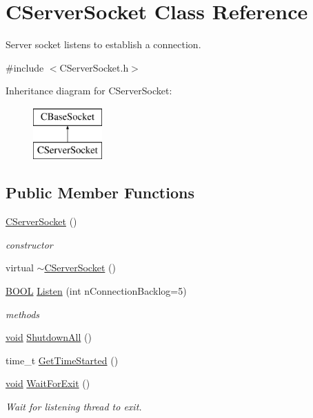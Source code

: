 \hypertarget{class_c_server_socket}{\section{\-C\-Server\-Socket \-Class \-Reference}
\label{class_c_server_socket}
}


\-Server socket listens to establish a connection.  




{\ttfamily \#include $<$\-C\-Server\-Socket.\-h$>$}

\-Inheritance diagram for \-C\-Server\-Socket\-:\begin{figure}[H]
\begin{center}
\leavevmode
\includegraphics[height=2.000000cm]{class_c_server_socket}
\end{center}
\end{figure}
\subsection*{\-Public \-Member \-Functions}
\begin{DoxyCompactItemize}
\item 
\hyperlink{class_c_server_socket_a3ad9f83aa8aace5b319901abcc3b294b}{\-C\-Server\-Socket} ()
\begin{DoxyCompactList}\small\item\em constructor \end{DoxyCompactList}\item 
virtual \hyperlink{class_c_server_socket_a2efd5612c3e0258a6c3bb4fccca80bde}{$\sim$\-C\-Server\-Socket} ()
\item 
\hyperlink{_cpclient_8h_a3be13892ae7076009afcf121347dd319}{\-B\-O\-O\-L} \hyperlink{class_c_server_socket_a0cd67eacfd95ead6bdc8dab72464a5af}{\-Listen} (int n\-Connection\-Backlog=5)
\begin{DoxyCompactList}\small\item\em methods \end{DoxyCompactList}\item 
\hyperlink{_cpclient_8h_a6464f7480a0fd0ee170cba12b2c0497f}{void} \hyperlink{class_c_server_socket_a3992fdf11a055394a230044609d0f73e}{\-Shutdown\-All} ()
\item 
time\-\_\-t \hyperlink{class_c_server_socket_a52af0d07399deab64d56dfe10d81982b}{\-Get\-Time\-Started} ()
\item 
\hyperlink{_cpclient_8h_a6464f7480a0fd0ee170cba12b2c0497f}{void} \hyperlink{class_c_server_socket_a69e9bf0bcdf51797df78cf595cd5c528}{\-Wait\-For\-Exit} ()
\begin{DoxyCompactList}\small\item\em \-Wait for listening thread to exit. \end{DoxyCompactList}\end{DoxyCompactItemize}
